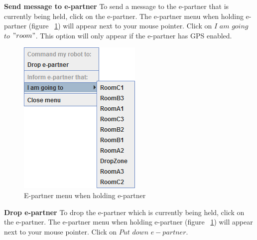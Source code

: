 \raggedright{\textbf{Send message to e-partner}}
To send a message to the e-partner that is currently being held, click on the e-partner. The e-partner menu when holding e-partner (figure  ~\ref{fig:epartnerMenu3}) will appear next to your mouse pointer. Click on $I$ $am$ $going$ $to$ $"room"$. This option will only appear if the e-partner has GPS enabled.
\\
\begin{figure}[h]
\begin{center}
\includegraphics{NewFeatures/hpg-epartner-menu3.png}
\end{center}
\caption{E-partner menu when holding e-partner}
\label{fig:epartnerMenu3}
\end{figure}

\textbf{Drop e-partner}
To drop the e-partner which is currently being held, click on the e-partner. The e-partner menu when holding e-partner (figure  ~\ref{fig:epartnerMenu3}) will appear next to your mouse pointer. Click on $Put$ $down$ $e-partner$.

